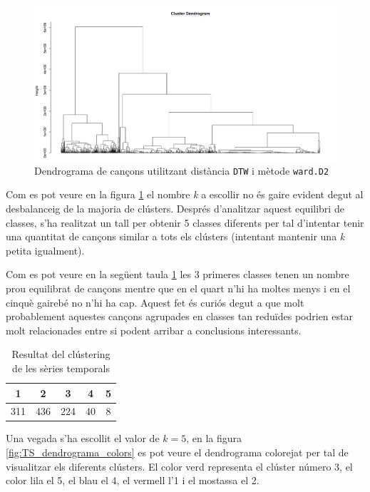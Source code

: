 \begin{figure}[H]
    \centering
    \includegraphics[width=\textwidth]{Images/4_clustering/time_series/dendrograma_original.png}
    \caption{Dendrograma de cançons utilitzant distància \texttt{DTW} i mètode \texttt{ward.D2}}
    \label{fig:TS_dendrograma_original}
\end{figure}

Com es pot veure en la figura \ref{fig:TS_dendrograma_original} el nombre \textit{k} a escollir no és gaire evident degut al desbalanceig de la majoria de clústers. Després d'analitzar aquest equilibri de classes, s'ha realitzat un tall per obtenir 5 classes diferents per tal d'intentar tenir una quantitat de cançons similar a tots els clústers (intentant mantenir una \textit{k} petita igualment).

Com es pot veure en la següent taula \ref{tab:TS_clustering_results} les 3 primeres classes tenen un nombre prou equilibrat de cançons mentre que en el quart n'hi ha moltes menys i en el cinquè gairebé no n'hi ha cap. Aquest fet és curiós degut a que molt probablement aquestes cançons agrupades en classes tan reduïdes podrien estar molt relacionades entre si podent arribar a conclusions interessants.

\begin{table}[H]
\centering
\begin{tabular}{|c|c|c|c|c|}
\hline
1    & 2    & 3   & 4   & 5 \\ \hline
311 & 436 & 224 & 40 & 8  \\ \hline
\end{tabular}
\caption{Resultat del clústering de les sèries temporals}
\label{tab:TS_clustering_results}
\end{table}

Una vegada s'ha escollit el valor de $k = 5$, en la figura \ref{fig:TS_dendrograma_colors} es pot veure el dendrograma colorejat per tal de visualitzar els diferents clústers. El color verd representa el clúster número 3, el color lila el 5, el blau el 4, el vermell l'1 i el mostassa el 2.

